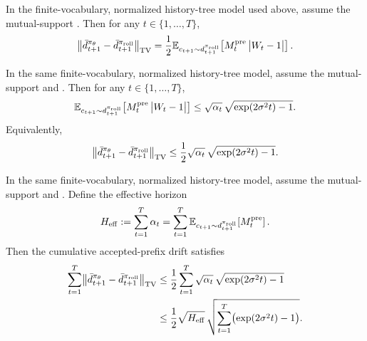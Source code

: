 \begin{lemma}
\label{lem:tv-accepted-prefix}
In the finite-vocabulary, normalized history-tree model used above, assume the
mutual-support . Then for any $t\in\{1,\ldots,T\}$,
\begin{equation*}
    \bigl\|\bar{d}_{t+1}^{\pi_{\theta}} - \bar{d}_{t+1}^{\pi_{\mathrm{roll}}}\bigr\|_{\mathrm{TV}}
    =
    \frac{1}{2}\mathbb{E}_{c_{t+1}\sim d_{t+1}^{\pi_{\mathrm{roll}}}}\!\left[M_t^{\mathrm{pre}}\,\big|W_t-1\big|\right].
\end{equation*}
\end{lemma}

\begin{corollary}
\label{cor:tv-accepted-subgaussian}
In the same finite-vocabulary, normalized history-tree model, assume the
mutual-support  and . Then for any
$t\in\{1,\ldots,T\}$,
\begin{equation*}
    \mathbb{E}_{c_{t+1}\sim d_{t+1}^{\pi_{\mathrm{roll}}}}\!\left[M_t^{\mathrm{pre}}\,\big|W_t-1\big|\right]
    \le
    \sqrt{\alpha_t}\,\sqrt{\exp(2\sigma^2 t)-1}.
\end{equation*}
Equivalently,
\begin{equation*}
    \bigl\|\bar{d}_{t+1}^{\pi_{\theta}} - \bar{d}_{t+1}^{\pi_{\mathrm{roll}}}\bigr\|_{\mathrm{TV}}
    \le
    \frac{1}{2}\sqrt{\alpha_t}\,\sqrt{\exp(2\sigma^2 t)-1}.
\end{equation*}
\end{corollary}

\begin{corollary}
\label{cor:effective-horizon}
In the same finite-vocabulary, normalized history-tree model, assume the
mutual-support  and . Define the
effective horizon
\begin{equation*}
    H_{\mathrm{eff}} := \sum_{t=1}^{T}\alpha_t = \sum_{t=1}^{T}\mathbb{E}_{c_{t+1}\sim d_{t+1}^{\pi_{\mathrm{roll}}}}\!\left[M_t^{\mathrm{pre}}\right].
\end{equation*}
Then the cumulative accepted-prefix drift satisfies
\begin{align*}
    \sum_{t=1}^{T}\bigl\|\bar{d}_{t+1}^{\pi_{\theta}} - \bar{d}_{t+1}^{\pi_{\mathrm{roll}}}\bigr\|_{\mathrm{TV}}
    &\le
    \frac{1}{2}\sum_{t=1}^{T}\sqrt{\alpha_t}\,\sqrt{\exp(2\sigma^2 t)-1}
    \\
    &\le
    \frac{1}{2}\sqrt{H_{\mathrm{eff}}}\,
    \sqrt{\sum_{t=1}^{T}\bigl(\exp(2\sigma^2 t)-1\bigr)}.
\end{align*}
\end{corollary}

